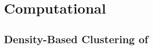 \section{Computational}
\subsection{Density-Based Clustering of \Pyros{}}\label{sec:dbscan}
\subsection{\kNNlong{}}